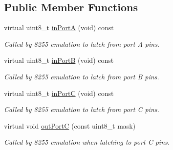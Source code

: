 \subsection*{Public Member Functions}
\begin{DoxyCompactItemize}
\item 
\hypertarget{classPC98__Mouse__8255_ae7643f0d9646d6aac477f26fbf6132a4}{virtual uint8\-\_\-t \hyperlink{classPC98__Mouse__8255_ae7643f0d9646d6aac477f26fbf6132a4}{in\-Port\-A} (void) const }\label{classPC98__Mouse__8255_ae7643f0d9646d6aac477f26fbf6132a4}

\begin{DoxyCompactList}\small\item\em Called by 8255 emulation to latch from port A pins. \end{DoxyCompactList}\item 
\hypertarget{classPC98__Mouse__8255_a62483e81d5fad011aaaca35aeee59308}{virtual uint8\-\_\-t \hyperlink{classPC98__Mouse__8255_a62483e81d5fad011aaaca35aeee59308}{in\-Port\-B} (void) const }\label{classPC98__Mouse__8255_a62483e81d5fad011aaaca35aeee59308}

\begin{DoxyCompactList}\small\item\em Called by 8255 emulation to latch from port B pins. \end{DoxyCompactList}\item 
\hypertarget{classPC98__Mouse__8255_aa65cf202bb7b8c59cd7911aeddf9f2bd}{virtual uint8\-\_\-t \hyperlink{classPC98__Mouse__8255_aa65cf202bb7b8c59cd7911aeddf9f2bd}{in\-Port\-C} (void) const }\label{classPC98__Mouse__8255_aa65cf202bb7b8c59cd7911aeddf9f2bd}

\begin{DoxyCompactList}\small\item\em Called by 8255 emulation to latch from port C pins. \end{DoxyCompactList}\item 
\hypertarget{classPC98__Mouse__8255_af64ccdbfb0d8eff0711088b3de6b4949}{virtual void \hyperlink{classPC98__Mouse__8255_af64ccdbfb0d8eff0711088b3de6b4949}{out\-Port\-C} (const uint8\-\_\-t mask)}\label{classPC98__Mouse__8255_af64ccdbfb0d8eff0711088b3de6b4949}

\begin{DoxyCompactList}\small\item\em Called by 8255 emulation when latching to port C pins. \end{DoxyCompactList}\end{DoxyCompactItemize}


